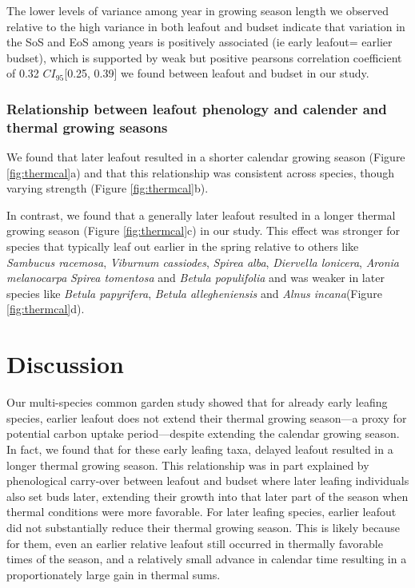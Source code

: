 \documentclass[12 pt]{article}
\begin{document}
The lower levels of variance among year in growing season length we observed relative to the high variance in both leafout and budset indicate that variation in the SoS and EoS among years is positively associated (ie early leafout= earlier budset), which is supported by weak but positive pearsons correlation coefficient of 0.32 $CI_{95}$[0.25, 0.39] we found between leafout and budset in our study.

\subsubsection{Relationship between leafout phenology and calender and thermal growing seasons}

We found that later leafout resulted in a shorter calendar growing season (Figure \ref{fig:thermcal}a) and that this relationship was consistent across species, though varying strength  (Figure \ref{fig:thermcal}b).

In contrast, we found that a generally later leafout resulted in a longer thermal growing season (Figure \ref{fig:thermcal}c) in our study. This effect was stronger for species that typically leaf out earlier in the spring relative to others like \emph{Sambucus racemosa}, \emph{Viburnum cassiodes}, \emph{Spirea alba}, \emph{Diervella lonicera}, \emph{Aronia melanocarpa} \emph{Spirea tomentosa} and \emph{Betula populifolia} and was weaker in later species like \emph{Betula papyrifera}, \emph{Betula allegheniensis} and \emph{Alnus incana}(Figure \ref{fig:thermcal}d).


\section{Discussion}
Our multi-species common garden study showed that for already early leafing species, earlier leafout does not extend their thermal growing season---a proxy for potential carbon uptake period---despite extending the calendar growing season. In fact, we found that for these early leafing taxa, delayed leafout resulted in a longer thermal growing season. This relationship was in part explained by phenological carry-over between leafout and budset where later leafing individuals also set buds later, extending their growth into that later part of the season when thermal conditions were more favorable.  For later leafing species, earlier leafout did not substantially reduce their thermal growing season. This is likely because for them, even an earlier relative leafout still occurred in thermally favorable times of the season, and a relatively small advance in calendar time resulting in a proportionately large gain in thermal sums.
\end{document}
